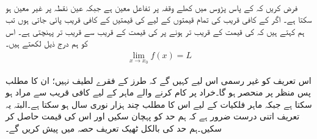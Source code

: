 \\
فرض کریں کہ  کے پاس پڑوس میں   کھلے وقفہ پر تفاعل  معین ہے جبکہ عین نقطہ  پر  غیر معین ہو سکتا ہے۔ اگر  کے کافی قریب  کی  تمام قیمتوں کے لیے  کی قیمتیں  کے کافی قریب پائی جاتی ہوں تب ہم کہتے ہیں کہ  کی قیمت   کے قریب تر ہونے  پر  کی قیمت    کے قریب سے قریب تر   پہنچتی ہے۔ اس کو ہم درج ذیل لکھتے ہیں۔
\begin{align*}
\lim_{x\to x_0} f(x)=L
\end{align*}

اس تعریف کو غیر رسمی اس لیے کہیں گے  کہ   طرز کے فقرے لطیف نہیں؛ ان کا مطلب  پس منظر پر منحصر ہو گا۔خراد پر کام کرنے والے ماہر کے لیے کافی قریب سے مراد  ہو سکتا ہے جبکہ ماہر فلکیات کے لیے اس کا مطلب چند ہزار نوری سال ہو سکتا ہے۔البتہ یہ تعریف اتنی درست ضرور ہے کہ ہم حد کو پہچان سکیں اور اس کی قیمت حاصل کر سکیں۔ہم حد کی بالکل ٹھیک تعریف حصہ  میں  پیش کریں گے۔

